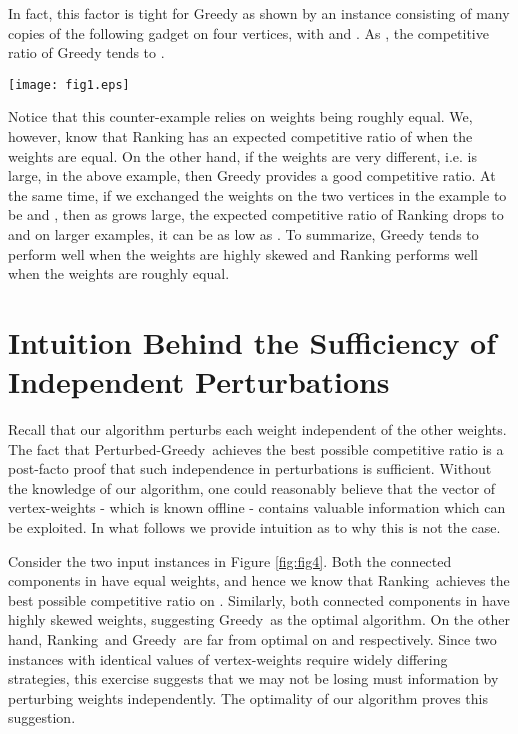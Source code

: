 \documentclass[11pt]{article}
\newcommand{\greedy}{{\sc Greedy}}
\newcommand{\ranking}{{\sc Ranking}}
\newcommand{\pgreedy}{{\sc Perturbed-Greedy}}
\begin{document}
In fact, this factor  is tight for {\sc Greedy} as shown by an instance consisting
  of many copies of the following gadget on four vertices, with  and . As , the
  competitive ratio of {\sc Greedy} tends to .

\begin{center}
\texttt{[image: fig1.eps]}
\end{center}

Notice that this counter-example relies on weights being roughly
equal. We, however, know that {\sc Ranking} has an expected
competitive ratio of  when the weights are equal. On the
other hand, if the weights are very different, i.e.  is
large, in the above example, then {\sc Greedy} provides a good
competitive ratio. At the same time, if we exchanged the weights on
the two vertices in the example to be  and , then as  grows large, the expected competitive
ratio of {\sc Ranking} drops to  and on larger examples,
it can be as low as . To summarize, {\sc Greedy} tends to
perform well when the weights are highly skewed and {\sc Ranking}
performs well when the weights are roughly equal.

\section{Intuition Behind the Sufficiency of Independent Perturbations}
\label{app6}

Recall that our algorithm perturbs each weight  independent of the other weights. The fact that \pgreedy~achieves the best possible competitive ratio is a post-facto proof that such independence in perturbations is sufficient. Without the knowledge of our algorithm, one could reasonably believe that the vector of vertex-weights  - which is known offline - contains valuable information which can be exploited. In what follows we provide intuition as to why this is not the case.

Consider the two input instances in Figure \ref{fig:fig4}. Both the connected components in  have equal weights, and hence we know that \ranking~achieves the best possible competitive ratio on . Similarly, both connected components in  have highly skewed weights, suggesting \greedy~as the optimal algorithm. On the other hand, \ranking~and \greedy~are far from optimal on  and  respectively. Since two instances with identical values of vertex-weights require widely differing strategies, this exercise suggests that we may not be losing must information by perturbing weights independently. The optimality of our algorithm proves this suggestion.
\end{document}
